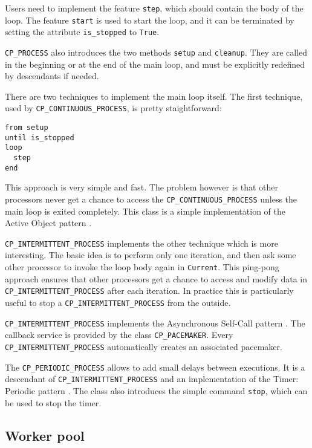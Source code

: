 Users need to implement the feature \lstinline!step!, which should contain the body of the loop.
The feature \lstinline!start! is used to start the loop, and it can be terminated by setting the attribute \lstinline!is_stopped! to \lstinline!True!.

\lstinline!CP_PROCESS! also introduces the two methods \lstinline!setup! and \lstinline!cleanup!.
They are called in the beginning or at the end of the main loop, and must be explicitly redefined by descendants if needed.

There are two techniques to implement the main loop itself.
The first technique, used by \lstinline!CP_CONTINUOUS_PROCESS!, is pretty staightforward:
\begin{lstlisting}
from setup
until is_stopped
loop
  step
end
\end{lstlisting}
This approach is very simple and fast. 
The problem however is that other processors never get a chance to access the \lstinline!CP_CONTINUOUS_PROCESS! unless the main loop is exited completely.
This class is a simple implementation of the Active Object pattern .

\lstinline!CP_INTERMITTENT_PROCESS! implements the other technique which is more interesting.
The basic idea is to perform only one iteration, and then ask some other processor to invoke the loop body again in \lstinline!Current!.
This ping-pong approach ensures that other processors get a chance to access and modify data in \lstinline!CP_INTERMITTENT_PROCESS! after each iteration.
In practice this is particularly useful to stop a \lstinline!CP_INTERMITTENT_PROCESS! from the outside.

\lstinline!CP_INTERMITTENT_PROCESS! implements the Asynchronous Self-Call pattern .
The callback service is provided by the class \lstinline!CP_PACEMAKER!.
Every \lstinline!CP_INTERMITTENT_PROCESS! automatically creates an associated pacemaker.

The \lstinline!CP_PERIODIC_PROCESS! allows to add small delays between executions. 
It is a descendant of \lstinline!CP_INTERMITTENT_PROCESS! and an implementation of the Timer: Periodic pattern .
The class also introduces the simple command \lstinline!stop!, which can be used to stop the timer.


\subsection{Worker pool}
\label{sec:worker_pool} 

